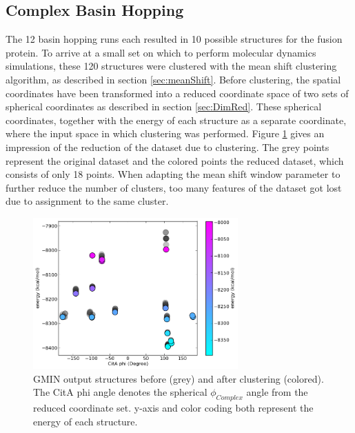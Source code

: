 \documentclass[english, a4paper, 12pt, titlepage, draft]{article}
\begin{document}
\subsection{Complex Basin Hopping}

The 12 basin hopping runs each resulted in 10 possible structures for the fusion protein.
To arrive at a small set on which to perform molecular dynamics simulations, these 120 structures were clustered with the mean shift clustering algorithm, as described in section \ref{sec:meanShift}.
Before clustering, the spatial coordinates have been transformed into a reduced coordinate space of two sets of spherical coordinates as described in section \ref{sec:DimRed}.
These spherical coordinates, together with the energy of each structure as a separate coordinate, where the input space in which clustering was performed.
Figure \ref{fig:GMIN_CitA_phi} gives an impression of the reduction of the dataset due to clustering.
The grey points represent the original dataset and the colored points the reduced dataset, which consists of only 18 points.
When adapting the mean shift window parameter to further reduce the number of clusters, too many features of the dataset got lost due to assignment to the same cluster.


\begin{figure}
    \centering
    \includegraphics[width=0.7\textwidth]{figures/CitA_phi.png}
    \caption{GMIN output structures before (grey) and after clustering (colored).
        The CitA phi angle denotes the spherical $\phi_{Complex}$ angle from the reduced coordinate set.
        y-axis and color coding both represent the energy of each structure.}
    \label{fig:GMIN_CitA_phi}
\end{figure}        
\end{document}
